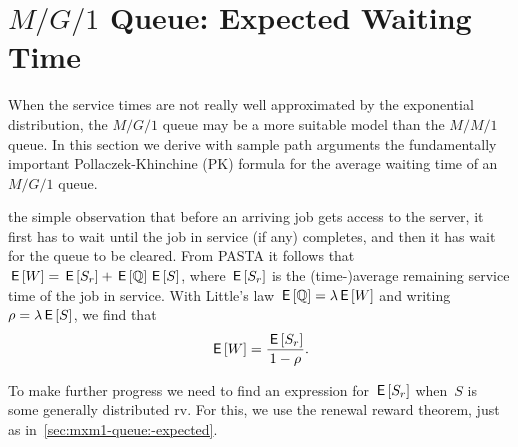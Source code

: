 \documentclass[queueing-book.tex]{subfiles}
\begin{document}
\section{\texorpdfstring{$M/G/1$}{MG1} Queue: Expected Waiting Time}
\label{sec:mg1}


When the service times are not really well approximated by the exponential distribution, the $M/G/1$ queue may be a more suitable model than the $M/M/1$ queue.
In this section we derive with sample path arguments the fundamentally important Pollaczek-Khinchine (PK) formula for the average waiting time of an $M/G/1$ queue.


 the simple observation that before an arriving job gets access to the server, it first has to wait until the job in service (if any) completes, and then it has wait for the queue to be cleared.
From PASTA it follows that $\,\mathsf{E}\left[W\right] = \,\mathsf{E}\left[S_r\right] + \,\mathsf{E}\left[\mathbb{Q}\right] \,\mathsf{E}\left[S\right]$, where $\,\mathsf{E}\left[S_r\right]$ is the (time-)average remaining service time of the job in service.
With Little's law $\,\mathsf{E}\left[\mathbb{Q}\right] = \lambda \,\mathsf{E}\left[W\right]$ and writing $\rho = \lambda \,\mathsf{E}\left[S\right]$, we find that
\begin{equation*}
 \,\mathsf{E}\left[W\right] = \frac{\,\mathsf{E}\left[S_r\right]}{1-\rho}.
\end{equation*}

To make further progress we need to find an expression for $\,\mathsf{E}\left[S_r\right]$ when~$S$ is some generally distributed rv.
For this, we use the renewal reward theorem, just as in~\cref{sec:mxm1-queue:-expected}.
\end{document}
